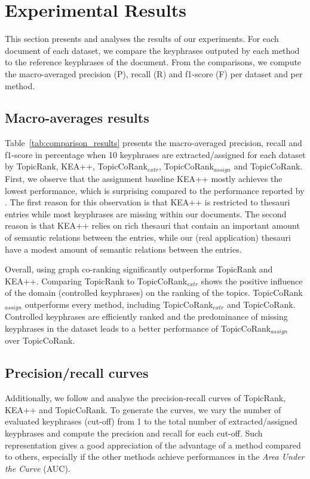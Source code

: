 \section{Experimental Results}
\label{sec:experimental_results}
    This section presents and analyses the results of our experiments.
    For each document of each dataset, we compare the keyphrases outputed by each method to the reference keyphrases of the document.
    From the comparisons, we compute the macro-averaged precision (P), recall (R) and f1-score (F) per dataset and per method.
        
    \subsection{Macro-averages results}
    \label{subsec:macro_averages_results}
        Table~\ref{tab:comparison_results} presents the macro-averaged precision, recall and f1-score in percentage when 10 keyphrases are extracted/assigned for each dataset by TopicRank, KEA++, TopicCo\-Rank$_{\textit{extr}}$, Topic\-CoRank$_{\textit{assign}}$ and TopicCoRank.
        First, we observe that the assignment baseline KEA++ mostly achieves the lowest performance, which is surprising compared to the performance reported by .
        The first reason for this observation is that KEA++ is restricted to thesauri entries while most keyphrases are missing within our documents.
        The second reason is that KEA++ relies on rich thesauri that contain an important amount of semantic relations between the entries, while our (real application) thesauri have a modest amount of semantic relations between the entries.

        Overall, using graph co-ranking significantly outperforms TopicRank and KEA++.
        Comparing TopicRank to TopicCoRank$_\textit{extr}$ shows the positive influence of the domain (controlled keyphrases) on the ranking of the topics.
        TopicCoRank$_\textit{assign}$ outperforms every method, including TopicCoRank$_\textit{extr}$ and TopicCoRank.
        Controlled keyphrases are efficiently ranked and the predominance of missing keyphrases in the dataset leads to a better performance of TopicCoRank$_\textit{assign}$ over TopicCoRank.
        
        
  
    \subsection{Precision/recall curves}
    \label{subsec:precision_recall_curves}
        Additionally, we follow  and analyse the precision-recall curves of TopicRank, KEA++ and TopicCoRank.
        To generate the curves, we vary the number of evaluated keyphrases (cut-off) from 1 to the total number of extracted/assigned key\-phrases and compute the precision and recall for each cut-off.
        Such representation gives a good appreciation of the advantage of a method compared to others, especially if the other methods achieve performances in the \textit{Area Under the Curve} (AUC).
        
